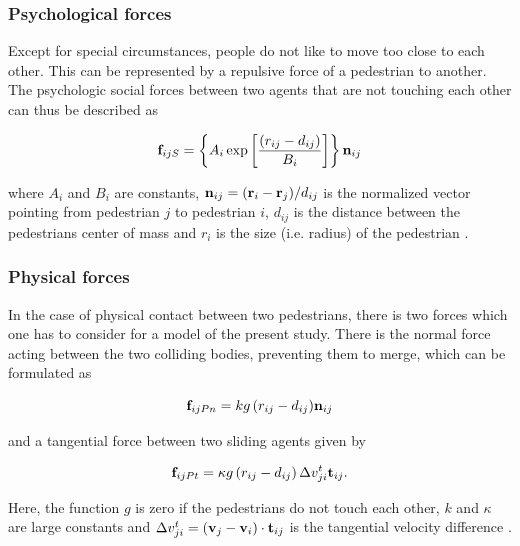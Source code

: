 \documentclass[11pt]{article}
\begin{document}
\subsubsection{Psychological forces}

Except for special circumstances, people do not like to move too close to each other. This can be represented by a repulsive force of a pedestrian to another. The psychologic social forces between two agents that are not touching each other can thus be described as

\begin{equation}
	{{\bf f}_{ijS}} = \left\{ {{A_i}\exp \left[ {\frac{{\left( {{r_{ij}} - {d_{ij}}} \right)}}{{{B_i}}}} \right] } \right\}{{\bf n}_{ij}} 
		\label{eq:fijS}
\end{equation}

where $A_i$ and $B_i$ are constants, ${\bf n}_{ij} = ({\bf r}_i - {\bf r}_j)/d_{ij}$ is the normalized vector pointing from pedestrian $j$ to pedestrian $i$, $d_{ij}$ is the distance between the pedestrians center of mass and $r_i$ is the size (i.e. radius) of the pedestrian \citep{Helbing2000}. 

\subsubsection{Physical forces}

In the case of physical contact between two pedestrians, there is two forces which one has to consider for a model of the present study. There is the normal force acting between the two colliding bodies, preventing them to merge, which can be formulated as

\begin{equation}
	{{\bf f}_{ijPn}} = {kg\left( {{r_{ij}} - {d_{ij}}} \right)} {{\bf n}_{ij}}
		\label{eq:fijPn}
\end{equation}

and a tangential force between two sliding agents given by

\begin{equation}
	{{\bf f}_{ijPt}} = \kappa g\left( {{r_{ij}} - {d_{ij}}} \right)\Delta v_{ji}^t{{\bf t}_{ij}} .
		\label{eq:fijPt}
\end{equation}

Here, the function $g$ is zero if the pedestrians do not touch each other, $k$ and $\kappa$ are large constants and $\Delta v_{ji}^t = ({\bf v}_j - {\bf v}_i)\cdot {\bf t}_{ij}$ is the tangential velocity difference \citep{Helbing2000}.
\end{document}
